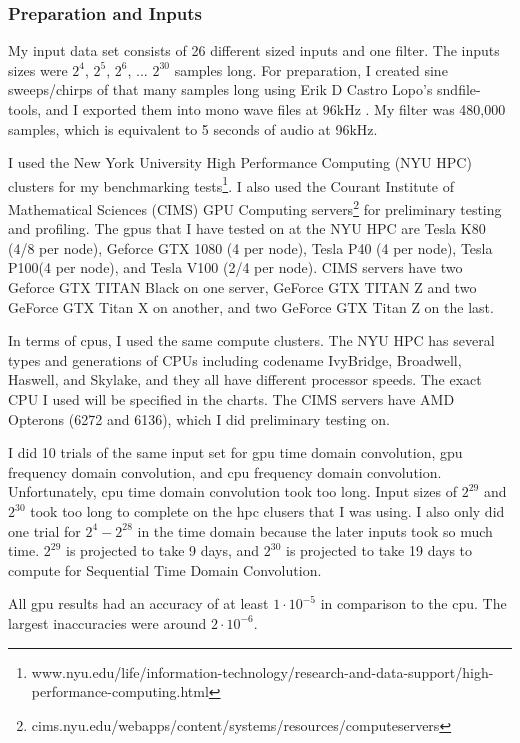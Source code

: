 
\subsubsection{Preparation and Inputs}
\indent \par My input data set consists of 26 different sized inputs and one filter. The inputs sizes were $2^4$, $2^5$, $2^6$, ... $2^{30}$ samples long. For preparation, I created sine sweeps/chirps of that many samples long using Erik D Castro Lopo's sndfile-tools, and I exported them into mono wave files at 96kHz \citep{lopo_2017}. My filter was 480,000 samples, which is equivalent to 5 seconds of audio at 96kHz.

I used the New York University High Performance Computing (NYU HPC) clusters for my benchmarking tests\footnote{www.nyu.edu/life/information-technology/research-and-data-support/high-performance-computing.html}. I also used the Courant Institute of Mathematical Sciences (CIMS) GPU Computing servers\footnote{cims.nyu.edu/webapps/content/systems/resources/computeservers} for preliminary testing and profiling. The \glspl{gpu} that I have tested on at the NYU HPC are Tesla K80 (4/8 per node), Geforce GTX 1080 (4 per node), Tesla P40 (4 per node), Tesla P100(4 per node), and Tesla V100 (2/4 per node). CIMS servers have two Geforce GTX TITAN Black on one server, GeForce GTX TITAN Z and two GeForce GTX Titan X on another, and two GeForce GTX Titan Z on the last. 

In terms of \glspl{cpu}, I used the same compute clusters. The NYU HPC has several types and generations of CPUs including codename IvyBridge, Broadwell, Haswell, and Skylake, and they all have different processor speeds. The exact CPU I used will be specified in the charts. The CIMS servers have AMD Opterons (6272 and 6136), which I did preliminary testing on.

I did 10 trials of the same input set for \gls{gpu} time domain convolution, \gls{gpu} frequency domain convolution, and \gls{cpu} frequency domain convolution. Unfortunately, \gls{cpu} time domain convolution took too long. Input sizes of $2^{29}$ and $2^{30}$ took too long to complete on the \gls{hpc} clusers that I was using. I also only did one trial for $2^4 - 2^{28}$ in the time domain because the later inputs took so much time. $2^{29}$ is projected to take 9 days, and $2^{30}$ is projected to take 19 days to compute for Sequential Time Domain Convolution. 

All \gls{gpu} results had an accuracy of at least $1 \cdot 10^{-5}$ in comparison to the \gls{cpu}. The largest inaccuracies were around $2 \cdot 10^{-6}$.

